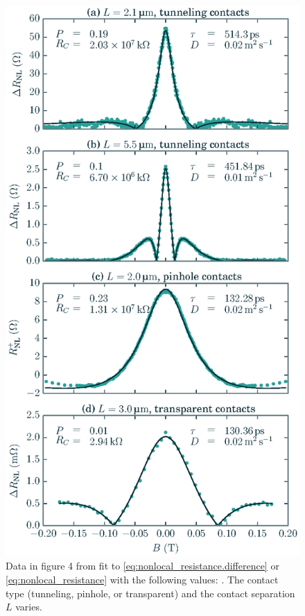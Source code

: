 \begin{figure}
  \caption{
    Data in figure 4 from \cite{PhysRevLett.105.167202}
    fit to \cref{eq:nonlocal_resistance.difference}
    or \cref{eq:nonlocal_resistance}
    with the following values: \plotFitsInfo.
    The contact type (tunneling, pinhole, or transparent)
    and the contact separation $L$ varies.
  }
  \label{fig:nonlocal_resistance.fits}
  \includegraphics[width=\columnwidth]{figures/plot_fits}
\end{figure}

